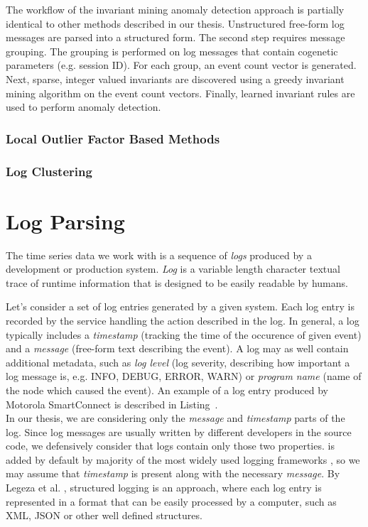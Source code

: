 The workflow of the invariant mining anomaly detection approach is partially identical to other methods described in our thesis. Unstructured free-form log messages are parsed into a structured form. The second step requires message grouping. The grouping is performed on log messages that contain cogenetic parameters (e.g. session ID). For each group, an event count vector is generated. Next, sparse, integer valued invariants are discovered using a greedy invariant mining algorithm on the event count vectors. Finally, learned invariant rules are used to perform anomaly detection.
\newpage

 \subsubsection{Local Outlier Factor Based Methods}
 
 \subsubsection{Log Clustering}
 
\section{Log Parsing}

The time series data we work with is a sequence of \textit{logs} produced by a development or production system. 
\textit{Log} is a variable length character textual trace of runtime information that is designed to be easily readable by humans.

Let's consider a set of log entries generated by a given system. Each log entry is recorded by the service handling the action described in the log. In general, a log typically includes a \textit{timestamp} (tracking the time of the occurence of given event) and a \textit{message} (free-form text describing the event). A log may as well contain additional metadata, such as \textit{log level} (log severity, describing how important a log message is, e.g. INFO, DEBUG, ERROR, WARN) or \textit{program name} (name of the node which caused the event). An example of a log entry produced by Motorola SmartConnect is described in Listing~.\\

In our thesis, we are considering only the \textit{message} and \textit{timestamp} parts of the log. Since log messages are usually written by different developers in the source code, we defensively consider that logs contain only those two properties.  is added by default by majority of the most widely used logging frameworks \cite{log4j:example} \cite{serilog:example} \cite{python_log:example}, so we may assume that \textit{timestamp} is present along with the necessary \textit{message}.
By Legeza et al. \cite{structured_logging}, structured logging is an approach, where each log entry is represented in a format that can be easily processed by a computer, such as XML, JSON or other well defined structures.

